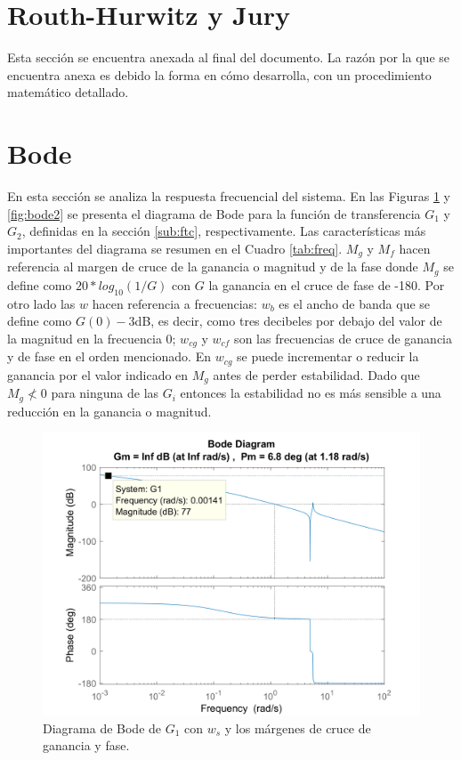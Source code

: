 \documentclass[journal]{IEEEtran}
\begin{document}
\section{Routh-Hurwitz y Jury}
Esta sección se encuentra anexada al final del documento. La razón por la que se encuentra anexa es debido la forma en cómo desarrolla,  con un procedimiento matemático detallado.

\section{Bode}

En esta sección se analiza la respuesta frecuencial del sistema. En las Figuras \ref{fig:bode1} y \ref{fig:bode2} se presenta el diagrama de Bode para la función de transferencia $G_1$ y $G_2$, definidas en la sección \ref{sub:ftc}, respectivamente. Las características más importantes del diagrama se resumen en el Cuadro \ref{tab:freq}. $M_g$ y $M_f$ hacen referencia al margen de cruce de la ganancia o magnitud y de la fase donde $M_g$ se define como $20*log_{10}(1/G)$ con $G$ la ganancia en el cruce de fase de -180. Por otro lado las $w$ hacen referencia a frecuencias: $w_b$ es el ancho de banda que se define como $G(0)-3$dB, es decir, como tres decibeles por debajo del valor de la magnitud en la frecuencia 0; $w_{cg}$ y $w_{cf}$ son las frecuencias de cruce de ganancia y de fase en el orden mencionado. En $w_{cg}$ se puede incrementar o reducir la ganancia por el valor indicado en $M_g$ antes de perder estabilidad. Dado que $M_g \not< 0$ para ninguna de las $G_i$ entonces la estabilidad no es más sensible a una reducción en la ganancia o magnitud.\\

\begin{figure}[h!]
\caption{Diagrama de Bode de $G_1$ con $w_s$ y los márgenes de cruce de ganancia y fase.\label{fig:bode1}}
  \centering
\includegraphics[scale=0.25]{Bode/BodeG1.png}
\end{figure}
\end{document}
